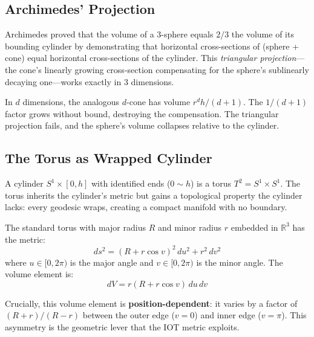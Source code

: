 \subsection{Archimedes' Projection}

Archimedes proved that the volume of a 3-sphere equals $2/3$ the volume of its bounding cylinder by demonstrating that horizontal cross-sections of (sphere + cone) equal horizontal cross-sections of the cylinder. This \emph{triangular projection}---the cone's linearly growing cross-section compensating for the sphere's sublinearly decaying one---works exactly in 3 dimensions.

In $d$ dimensions, the analogous $d$-cone has volume $r^d h/(d+1)$. The $1/(d+1)$ factor grows without bound, destroying the compensation. The triangular projection fails, and the sphere's volume collapses relative to the cylinder.

\subsection{The Torus as Wrapped Cylinder}

A cylinder $S^1 \times [0, h]$ with identified ends ($0 \sim h$) is a torus $T^2 = S^1 \times S^1$. The torus inherits the cylinder's metric but gains a topological property the cylinder lacks: every geodesic wraps, creating a compact manifold with no boundary.

The standard torus with major radius $R$ and minor radius $r$ embedded in $\mathbb{R}^3$ has the metric:
\begin{equation}
    ds^2 = (R + r\cos v)^2 \, du^2 + r^2 \, dv^2
    \label{eq:torus_metric}
\end{equation}
where $u \in [0, 2\pi)$ is the major angle and $v \in [0, 2\pi)$ is the minor angle. The volume element is:
\begin{equation}
    dV = r(R + r\cos v) \, du \, dv
\end{equation}

Crucially, this volume element is \textbf{position-dependent}: it varies by a factor of $(R+r)/(R-r)$ between the outer edge ($v = 0$) and inner edge ($v = \pi$). This asymmetry is the geometric lever that the IOT metric exploits.
